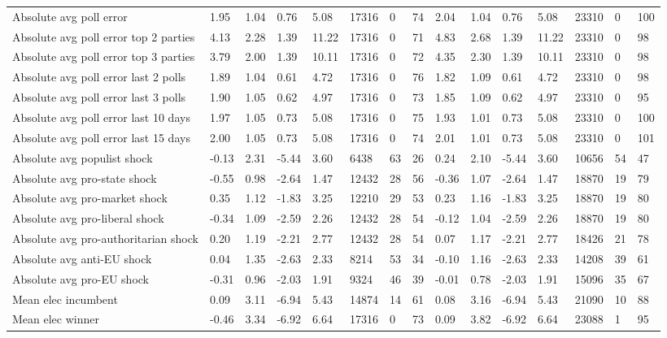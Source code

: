 \begin{longtable}{lllllllllllllll}
Absolute avg poll error & 1.95 & 1.04 & 0.76 & 5.08 & 17316 & 0 & 74 & 2.04 & 1.04 & 0.76 & 5.08 & 23310 & 0 & 100\\
Absolute avg poll error top 2 parties & 4.13 & 2.28 & 1.39 & 11.22 & 17316 & 0 & 71 & 4.83 & 2.68 & 1.39 & 11.22 & 23310 & 0 & 98\\
Absolute avg poll error top 3 parties & 3.79 & 2.00 & 1.39 & 10.11 & 17316 & 0 & 72 & 4.35 & 2.30 & 1.39 & 10.11 & 23310 & 0 & 98\\
\addlinespace
Absolute avg poll error last 2 polls & 1.89 & 1.04 & 0.61 & 4.72 & 17316 & 0 & 76 & 1.82 & 1.09 & 0.61 & 4.72 & 23310 & 0 & 98\\
Absolute avg poll error last 3 polls & 1.90 & 1.05 & 0.62 & 4.97 & 17316 & 0 & 73 & 1.85 & 1.09 & 0.62 & 4.97 & 23310 & 0 & 95\\
Absolute avg poll error last 10 days & 1.97 & 1.05 & 0.73 & 5.08 & 17316 & 0 & 75 & 1.93 & 1.01 & 0.73 & 5.08 & 23310 & 0 & 100\\
Absolute avg poll error last 15 days & 2.00 & 1.05 & 0.73 & 5.08 & 17316 & 0 & 74 & 2.01 & 1.01 & 0.73 & 5.08 & 23310 & 0 & 101\\
Absolute avg populist shock & -0.13 & 2.31 & -5.44 & 3.60 & 6438 & 63 & 26 & 0.24 & 2.10 & -5.44 & 3.60 & 10656 & 54 & 47\\
\addlinespace
Absolute avg pro-state shock & -0.55 & 0.98 & -2.64 & 1.47 & 12432 & 28 & 56 & -0.36 & 1.07 & -2.64 & 1.47 & 18870 & 19 & 79\\
Absolute avg pro-market shock & 0.35 & 1.12 & -1.83 & 3.25 & 12210 & 29 & 53 & 0.23 & 1.16 & -1.83 & 3.25 & 18870 & 19 & 80\\
Absolute avg pro-liberal shock & -0.34 & 1.09 & -2.59 & 2.26 & 12432 & 28 & 54 & -0.12 & 1.04 & -2.59 & 2.26 & 18870 & 19 & 80\\
Absolute avg pro-authoritarian shock & 0.20 & 1.19 & -2.21 & 2.77 & 12432 & 28 & 54 & 0.07 & 1.17 & -2.21 & 2.77 & 18426 & 21 & 78\\
Absolute avg anti-EU shock & 0.04 & 1.35 & -2.63 & 2.33 & 8214 & 53 & 34 & -0.10 & 1.16 & -2.63 & 2.33 & 14208 & 39 & 61\\
\addlinespace
Absolute avg pro-EU shock & -0.31 & 0.96 & -2.03 & 1.91 & 9324 & 46 & 39 & -0.01 & 0.78 & -2.03 & 1.91 & 15096 & 35 & 67\\
Mean elec incumbent & 0.09 & 3.11 & -6.94 & 5.43 & 14874 & 14 & 61 & 0.08 & 3.16 & -6.94 & 5.43 & 21090 & 10 & 88\\
Mean elec winner & -0.46 & 3.34 & -6.92 & 6.64 & 17316 & 0 & 73 & 0.09 & 3.82 & -6.92 & 6.64 & 23088 & 1 & 95\\

\end{longtable}
